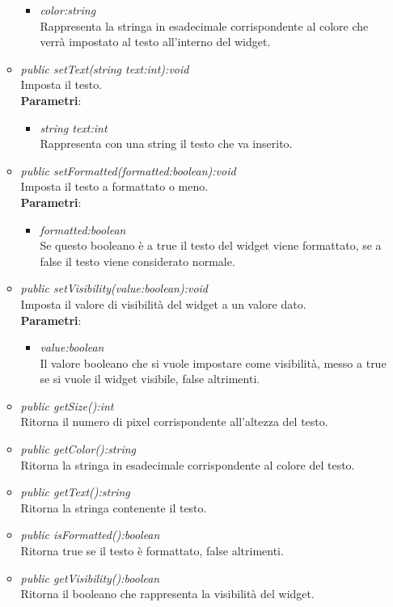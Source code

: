 \begin{itemize}
\begin{itemize}
\begin{itemize}
		\item \textit{color:string}\\
		Rappresenta la stringa in esadecimale corrispondente al colore che verrà impostato al testo all'interno del widget.
		\end{itemize} 
	\item \textit{public setText(string text:int):void}\\
	Imposta il testo.
		\\ \textbf{Parametri}: \begin{itemize}
		\item \textit{string text:int}\\
		Rappresenta con una string il testo che va inserito.
		\end{itemize} 
	\item \textit{public setFormatted(formatted:boolean):void}\\
	Imposta il testo a formattato o meno.
		\\ \textbf{Parametri}: \begin{itemize}
		\item \textit{formatted:boolean}\\
		Se questo booleano è a true il testo del widget viene formattato, se a false il testo viene considerato normale.
		\end{itemize} 
		\item \textit{public setVisibility(value:boolean):void}\\
	Imposta il valore di visibilità del widget a un valore dato.
			\\ \textbf{Parametri}: \begin{itemize}
			\item \textit{value:boolean}\\
			Il valore booleano che si vuole impostare come visibilità, messo a true se si vuole il widget visibile, false altrimenti.
	\end{itemize}
	\item \textit{public getSize():int}\\
	Ritorna il numero di pixel corrispondente all'altezza del testo.
	\item \textit{public getColor():string}\\
	Ritorna  la stringa in esadecimale corrispondente al colore del testo.
	\item \textit{public getText():string}\\
	Ritorna la stringa contenente il testo.
	\item \textit{public isFormatted():boolean}\\
	Ritorna true se il testo è formattato, false altrimenti.
	\item \textit{public getVisibility():boolean}\\
	Ritorna il booleano che rappresenta la visibilità del widget.
	\end{itemize}
\end{itemize}

